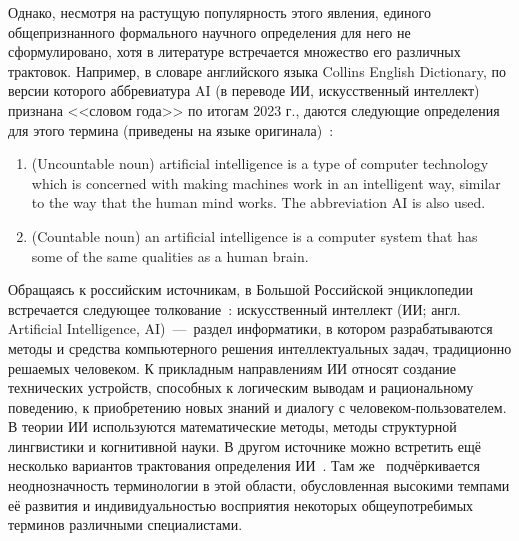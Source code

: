 Однако, несмотря на растущую популярность этого явления, единого общепризнанного формального научного определения для него не сформулировано, хотя в литературе встречается множество его различных трактовок. Например, в словаре английского языка Collins English Dictionary, по версии которого аббревиатура AI (в переводе ИИ, искусственный интеллект) признана <<словом года>> по итогам 2023 г., даются следующие определения для этого термина (приведены на языке оригинала)~\cite{collins}:
\begin{enumerate}[leftmargin=2.5em]
    \item (Uncountable noun) artificial intelligence is a type of computer technology which is concerned with making machines work in an intelligent way, similar to the way that the human mind works. The abbreviation AI is also used.
    \item (Countable noun) an artificial intelligence is a computer system that has some of the same qualities as a human brain.
\end{enumerate}
Обращаясь к российским источникам, в Большой Российской энциклопедии встречается следующее толкование~\cite{osipov}: искусственный интеллект (ИИ; англ. Artificial Intelligence, AI)~---~раздел информатики, в котором разрабатываются методы и средства компьютерного решения интеллектуальных задач, традиционно решаемых человеком. К прикладным направлениям ИИ относят создание технических устройств, способных к логическим выводам и рациональному поведению, к приобретению новых знаний и диалогу с человеком-пользователем. В теории ИИ используются математические методы, методы структурной лингвистики и когнитивной науки. В другом источнике можно встретить ещё несколько вариантов трактования определения ИИ~\cite[с.~247]{averkin}. Там же~\cite[с.~245]{averkin} подчёркивается неоднозначность терминологии в этой области, обусловленная высокими темпами её развития и индивидуальностью восприятия некоторых общеупотребимых терминов различными специалистами.


